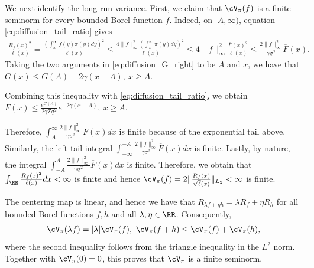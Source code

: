 \documentclass[11pt]{article}
\begin{document}
We next identify the long-run variance. First, we claim that 
$\cV_\pi(f)$ is a finite seminorm for every bounded Borel function $f$. Indeed, on
$[A,\infty)$, equation \eqref{eq:diffusion_tail_ratio} gives
\begin{align*}
\frac{R_f(x)^2}{\ell(x)}=\frac{(\int_{x}^\infty\overline{f}(y)\pi(y)dy)^2}{\ell(x)}\le\frac{4\|f\|_{\infty}^2(\int_{x}^{\infty}\pi(y)dy)^2}{\ell(x)}\le
4\|f\|_\infty^2
\frac{\overline F(x)^2}{\ell(x)}\le
\frac{2\|f\|_\infty^2}
{\gamma\underline\sigma^2}\overline F(x).
\end{align*}
Taking the two arguments in
\eqref{eq:diffusion_G_right} to be $A$ and $x$, we have that $G(x)
\le
G(A)-2\gamma(x-A),
\ x\ge A$.

Combining this inequality with
\eqref{eq:diffusion_tail_ratio}, we obtain $\overline F(x)
\le
\frac{e^{G(A)}}{2\gamma\mathsf Z\underline\sigma^2}
e^{-2\gamma(x-A)},\ x\ge A$.

Therefore, $\int_{A}^{\infty}\frac{2\|f\|_\infty^2}
{\gamma\underline\sigma^2}\overline F(x)dx$ is finite because of the exponential tail above. Similarly, the left
tail integral $\int_{-\infty}^{-A}\frac{2\|f\|_\infty^2}
{\gamma\underline\sigma^2}\overline F(x)dx$ is finite. Lastly, by nature, the integral $\int_{-A}^{A}\frac{2\|f\|_\infty^2}
{\gamma\underline\sigma^2}\overline F(x)dx$ is finite. Therefore, we obtain that
$\int_{\RR}\frac{R_f(x)^2}{\ell(x)}dx<\infty$ is finite and hence $\cV_\pi(f)
=
2\|\frac{R_f(x)}{\sqrt{\ell}(x)}\|_{L_2}<\infty$ is finite.

The centering map is linear, and hence we have that $R_{\lambda f+\eta h}
=
\lambda R_f+\eta R_h$ for all bounded Borel functions $f,h$ and all
$\lambda,\eta\in\RR$. Consequently,
\begin{align*}
\cV_\pi(\lambda f)
=
|\lambda|\cV_\pi(f),\ 
\cV_\pi(f+h)
\le
\cV_\pi(f)+\cV_\pi(h),
\end{align*}
where the second inequality follows from the triangle inequality in the
$L^2$ norm. Together with $\cV_\pi(0)=0$, this proves that
$\cV_\pi$ is a finite seminorm.
\end{document}
